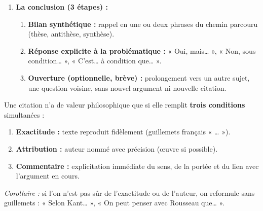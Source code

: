 \documentclass[11pt]{article}
\begin{document}
\begin{methode}
\begin{enumerate}
\begin{itemize}
      \item \textbf{Antithèse :} position opposée ou limite radicale de la thèse, argumentée de même façon.
      \item \textbf{Transition antithèse $\rightarrow$ synthèse :} bilan de l'opposition, besoin de dépassement.
      \item \textbf{Synthèse :} dépassement de l'opposition (pas un compromis mou) : montrer sous quelles conditions, à quel niveau, dans quelle mesure chaque position est valable ; apporter une réponse construite.
      \end{itemize}
\item \textbf{La conclusion (3 étapes) :}
      \begin{enumerate}
      \item \textbf{Bilan synthétique :} rappel en une ou deux phrases du chemin parcouru (thèse, antithèse, synthèse).
      \item \textbf{Réponse explicite à la problématique :} « Oui, mais… », « Non, sous condition… », « C'est… à condition que… ».
      \item \textbf{Ouverture (optionnelle, brève) :} prolongement vers un autre sujet, une question voisine, sans nouvel argument ni nouvelle citation.
      \end{enumerate}
\end{enumerate}
\end{methode}

\begin{propriete}
Une citation n'a de valeur philosophique que si elle remplit \textbf{trois conditions} simultanées :
\begin{enumerate}
\item \textbf{Exactitude :} texte reproduit fidèlement (guillemets français « … »).
\item \textbf{Attribution :} auteur nommé avec précision (œuvre si possible).
\item \textbf{Commentaire :} explicitation immédiate du sens, de la portée et du lien avec l'argument en cours.
\end{enumerate}
\emph{Corollaire :} si l'on n'est pas sûr de l'exactitude ou de l'auteur, on reformule sans guillemets : « Selon Kant… », « On peut penser avec Rousseau que… ».
\end{propriete}
\end{document}
